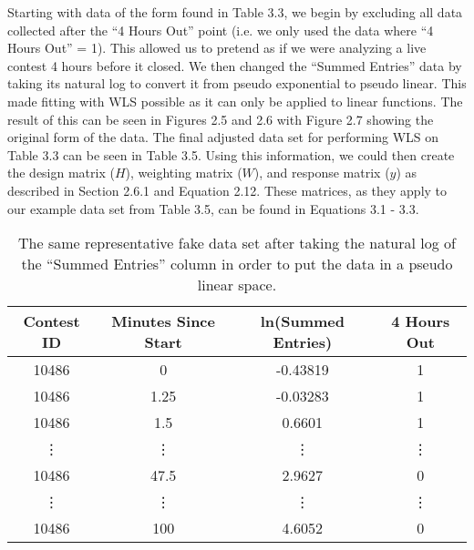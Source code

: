 Starting with data of the form found in Table 3.3, we begin by excluding all data collected after the ``4 Hours Out'' point (i.e. we only used the data where ``4 Hours Out'' = 1). This allowed us to pretend as if we were analyzing a live contest 4 hours before it closed. We then changed the ``Summed Entries'' data by taking its natural log to convert it from pseudo exponential to pseudo linear. This made fitting with WLS possible as it can only be applied to linear functions. The result of this can be seen in Figures 2.5 and 2.6 with Figure 2.7 showing the original form of the data. The final adjusted data set for performing WLS on Table 3.3 can be seen in Table 3.5. Using this information, we could then create the design matrix ($H$), weighting matrix ($W$), and response matrix ($y$) as described in Section 2.6.1 and Equation 2.12. These matrices, as they apply to our example data set from Table 3.5, can be found in Equations 3.1 - 3.3.

\begin{table}
\begin{center}
\begin{tabular}{| c | c | c | c |}
\hline
 \textbf{Contest ID} & \textbf{Minutes Since Start} & \textbf{ln(Summed Entries)} & \textbf{4 Hours Out} \\ 
 \hline
 10486 & 0 & -0.43819 & 1 \\  
 \hline
 10486 & 1.25 & -0.03283 & 1 \\
 \hline
 10486 & 1.5 & 0.6601 & 1 \\
 \hline
 \vdots & \vdots & \vdots & \vdots \\
 \hline
 10486 & 47.5 & 2.9627 & 0 \\
 \hline
 \vdots & \vdots & \vdots & \vdots \\
 \hline
 10486 & 100 & 4.6052 & 0 \\
 \hline
\end{tabular}
\caption{The same representative fake data set after taking the natural log of the ``Summed Entries'' column in order to put the data in a pseudo linear space.}
\end{center}
\end{table}

